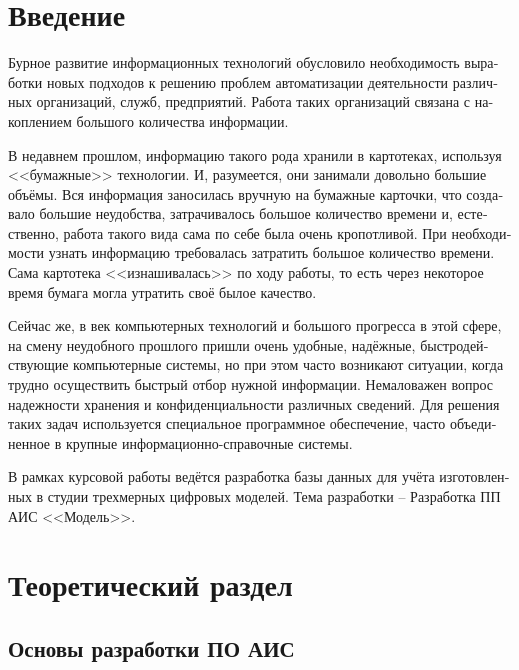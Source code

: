 \documentclass[a4paper, 12pt, titlepage]{article}
\begin{document}
\begin{otherlanguage}{russian}
\newpage

\tableofcontents
\newpage

\section{Введение}
\vspace{15mm}
\par Бурное развитие информационных технологий обусловило необходимость выработки новых подходов к решению проблем автоматизации деятельности различных организаций, служб, предприятий. Работа таких организаций связана с накоплением большого количества информации.\\

\par В недавнем прошлом, информацию такого рода хранили в картотеках, используя <<бумажные>> технологии. И, разумеется, они занимали довольно большие объёмы. Вся информация заносилась вручную на бумажные карточки, что создавало большие неудобства, затрачивалось большое количество времени и, естественно, работа такого вида сама по себе была очень кропотливой. При необходимости узнать информацию требовалась затратить большое количество времени. Сама картотека <<изнашивалась>> по ходу работы, то есть через некоторое время бумага могла утратить своё былое качество.

\par Сейчас же, в век компьютерных технологий и большого прогресса в этой сфере, на смену неудобного прошлого пришли очень удобные, надёжные, быстродействующие компьютерные системы, но при этом часто возникают ситуации, когда трудно осуществить быстрый отбор нужной информации. Немаловажен вопрос надежности хранения и конфиденциальности различных сведений. Для решения таких задач используется специальное программное обеспечение, часто объединенное в крупные информационно-справочные системы.\\

\par В рамках курсовой работы ведётся разработка базы данных для учёта изготовленных в студии трехмерных цифровых моделей. Тема разработки – Разработка ПП АИС <<Модель>>.

\newpage

\section{Теоретический раздел}
\subsection{Основы разработки ПО АИС}
\vspace{15mm}


\end{otherlanguage}
\end{document}
